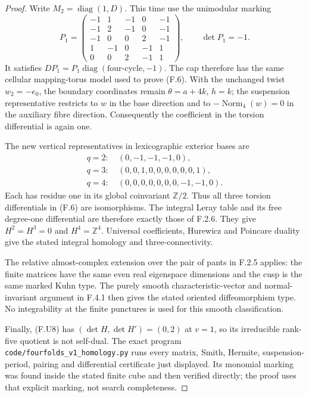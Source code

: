 \begin{proof}
Write $M_2=\operatorname{diag}(1,D)$.  This time use the
unimodular marking
\[
 P_1=\begin{pmatrix}
 -1&1&-1&0&-1\\
 -1&2&-1&0&-1\\
 -1&0&0&2&-1\\
 1&-1&0&-1&1\\
 0&0&2&-1&1
 \end{pmatrix},\qquad \det P_1=-1.
\]
It satisfies $DP_1=P_1\operatorname{diag}(\text{four-cycle},-1)$.
The cap therefore has the same cellular mapping-torus model
used to prove (F.6).  With the unchanged twist $w_2=-e_0$,
the boundary coordinates remain $\theta=a+4k$, $h=k$;
the suspension representative restricts to $w$ in the base
direction and to $-\operatorname{Norm}_4(w)=0$ in the
auxiliary fibre direction.  Consequently the coefficient in
the torsion differential is again one.

The new vertical representatives in lexicographic exterior
bases are
\[
\begin{split}
 q=2:\ &(0,-1,-1,-1,0),\\
 q=3:\ &(0,0,1,0,0,0,0,0,0,1),\\
 q=4:\ &(0,0,0,0,0,0,0,-1,-1,0).
\end{split}
\]
Each has residue one in its global coinvariant
$\mathbb Z/2$.  Thus all three torsion differentials in (F.6)
are isomorphisms.  The integral Leray table and its free
degree-one differential are therefore exactly those of
F.2.6.  They give $H^2=H^3=0$ and $H^4=\mathbb Z^4$.
Universal coefficients, Hurewicz and Poincare duality give
the stated integral homology and three-connectivity.

The relative almost-complex extension over the pair of pants
in F.2.5 applies: the finite matrices have the same even
real eigenspace dimensions and the cusp is the same marked
Kuhn type.  The purely smooth characteristic-vector and
normal-invariant argument in F.4.1 then gives the stated
oriented diffeomorphism type.  No integrability at the finite
punctures is used for this smooth classification.

Finally, (F.U8) has $(\det H,\det H')=(0,2)$ at $v=1$,
so its irreducible rank-five quotient is not self-dual.
The exact program
\texttt{code/fourfolds\_v1\_homology.py} runs every matrix,
Smith, Hermite, suspension-period, pairing and differential
certificate just displayed.  Its monomial marking was found
inside the stated finite cube and then verified directly;
the proof uses that explicit marking, not search completeness.
\end{proof}

